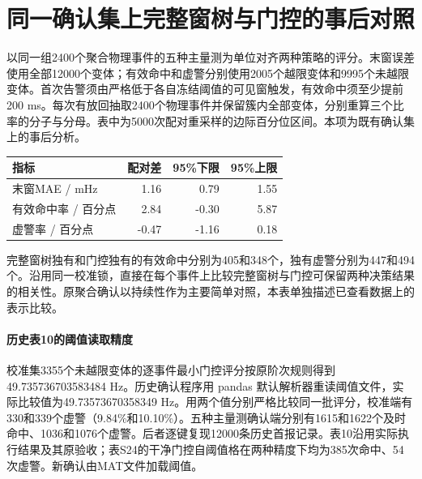 \documentclass[UTF8,a4paper,11pt]{ctexart}
\begin{document}
\clearpage\section{同一确认集上完整窗树与门控的事后对照}
以同一组2400个聚合物理事件的五种主量测为单位对齐两种策略的评分。末窗误差使用全部12000个变体；有效命中和虚警分别使用2005个越限变体和9995个未越限变体。首次告警须由严格低于各自冻结阈值的可见窗触发，有效命中须至少提前200 ms。每次有放回抽取2400个物理事件并保留簇内全部变体，分别重算三个比率的分子与分母。表中为5000次配对重采样的边际百分位区间。本项为既有确认集上的事后分析。

\begin{center}
\label{tab:raw-paired}
\begin{tabular}{lrrr}\toprule
指标 & 配对差 & 95\%下限 & 95\%上限 \\ \midrule
末窗MAE / mHz & 1.16 & 0.79 & 1.55 \\
有效命中率 / 百分点 & 2.84 & -0.30 & 5.87 \\
虚警率 / 百分点 & -0.47 & -1.16 & 0.18 \\
\bottomrule\end{tabular}\end{center}
完整窗树独有和门控独有的有效命中分别为405和348个，独有虚警分别为447和494个。沿用同一校准锁，直接在每个事件上比较完整窗树与门控可保留两种决策结果的相关性。原聚合确认以持续性作为主要简单对照，本表单独描述已查看数据上的表示比较。

\paragraph{历史表10的阈值读取精度} 校准集3355个未越限变体的逐事件最小门控评分按原阶次规则得到49.735736703583484 Hz。历史确认程序用 pandas 默认解析器重读阈值文件，实际比较值为49.73573670358349 Hz。用两个值分别严格比较同一批评分，校准端有330和339个虚警（9.84\%和10.10\%）。五种主量测确认端分别有1615和1622个及时命中、1036和1076个虚警。后者逐键复现12000条历史首报记录。表10沿用实际执行结果及其原验收；表S24的干净门控自阈值格在两种精度下均为385次命中、54次虚警。新确认由MAT文件加载阈值。
\end{document}
